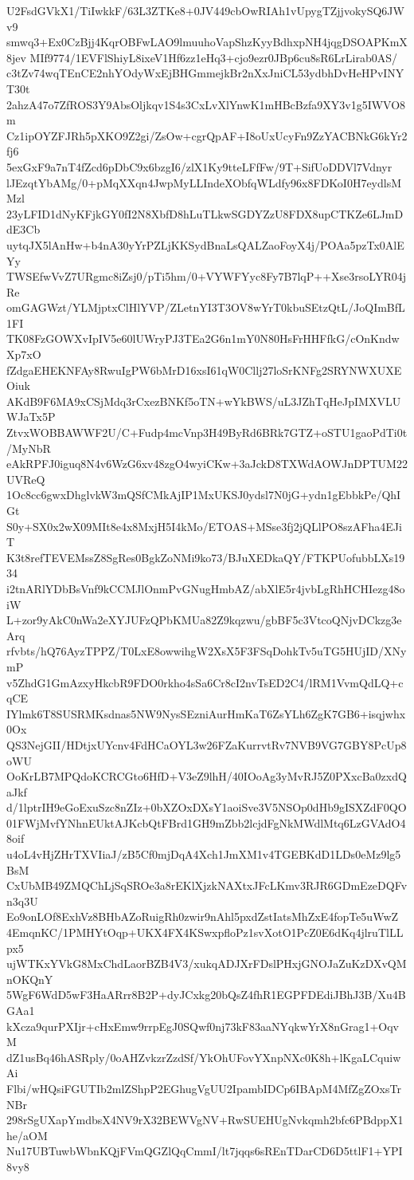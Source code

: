 U2FsdGVkX1/TiIwkkF/63L3ZTKe8+0JV449cbOwRIAh1vUpygTZjjvokySQ6JWv9
smwq3+Ex0CzBjj4KqrOBFwLAO9lmuuhoVapShzKyyBdhxpNH4jqgDSOAPKmX8jev
MIf9774/1EVFlShiyL8ixeV1Hf6zz1eHq3+cjo9ezr0JBp6cu8sR6LrLirab0AS/
c3tZv74wqTEnCE2nhYOdyWxEjBHGmmejkBr2nXxJniCL53ydbhDvHeHPvINYT30t
2ahzA47o7ZfROS3Y9AbsOljkqv1S4s3CxLvXlYnwK1mHBcBzfa9XY3v1g5IWVO8m
Cz1ipOYZFJRh5pXKO9Z2gi/ZsOw+cgrQpAF+I8oUxUcyFn9ZzYACBNkG6kYr2fj6
5exGxF9a7nT4fZcd6pDbC9x6bzgI6/zlX1Ky9tteLFfFw/9T+SifUoDDVl7Vdnyr
lJEzqtYbAMg/0+pMqXXqn4JwpMyLLIndeXObfqWLdfy96x8FDKoI0H7eydlsMMzl
23yLFID1dNyKFjkGY0fI2N8XbfD8hLuTLkwSGDYZzU8FDX8upCTKZe6LJmDdE3Cb
uytqJX5lAnHw+b4nA30yYrPZLjKKSydBnaLsQALZaoFoyX4j/POAa5pzTx0AlEYy
TWSEfwVvZ7URgmc8iZsj0/pTi5hm/0+VYWFYyc8Fy7B7lqP++Xse3rsoLYR04jRe
omGAGWzt/YLMjptxClHlYVP/ZLetnYI3T3OV8wYrT0kbuSEtzQtL/JoQImBfL1FI
TK08FzGOWXvIpIV5e60lUWryPJ3TEa2G6n1mY0N80HsFrHHFfkG/cOnKndwXp7xO
fZdgaEHEKNFAy8RwuIgPW6bMrD16xsI61qW0Cllj27loSrKNFg2SRYNWXUXEOiuk
AKdB9F6MA9xCSjMdq3rCxezBNKf5oTN+wYkBWS/uL3JZhTqHeJpIMXVLUWJaTx5P
ZtvxWOBBAWWF2U/C+Fudp4mcVnp3H49ByRd6BRk7GTZ+oSTU1gaoPdTi0t/MyNbR
eAkRPFJ0iguq8N4v6WzG6xv48zgO4wyiCKw+3aJckD8TXWdAOWJnDPTUM22UVReQ
1Oc8cc6gwxDhglvkW3mQSfCMkAjIP1MxUKSJ0ydsl7N0jG+ydn1gEbbkPe/QhIGt
S0y+SX0x2wX09MIt8e4x8MxjH5I4kMo/ETOAS+MSse3fj2jQLlPO8szAFha4EJiT
K3t8refTEVEMssZ8SgRes0BgkZoNMi9ko73/BJuXEDkaQY/FTKPUofubbLXs1934
i2tnARlYDbBsVnf9kCCMJlOnmPvGNugHmbAZ/abXlE5r4jvbLgRhHCHIezg48oiW
L+zor9yAkC0nWa2eXYJUFzQPbKMUa82Z9kqzwu/gbBF5c3VtcoQNjvDCkzg3eArq
rfvbts/hQ76AyzTPPZ/T0LxE8owwihgW2XsX5F3FSqDohkTv5uTG5HUjID/XNymP
v5ZhdG1GmAzxyHkcbR9FDO0rkho4sSa6Cr8cI2nvTsED2C4/lRM1VvmQdLQ+cqCE
IYlmk6T8SUSRMKsdnas5NW9NysSEzniAurHmKaT6ZsYLh6ZgK7GB6+isqjwhx0Ox
QS3NejGII/HDtjxUYcnv4FdHCaOYL3w26FZaKurrvtRv7NVB9VG7GBY8PcUp8oWU
OoKrLB7MPQdoKCRCGto6HfD+V3eZ9lhH/40IOoAg3yMvRJ5Z0PXxcBa0zxdQaJkf
d/1lptrIH9eGoExuSzc8nZIz+0bXZOxDXsY1aoiSve3V5NSOp0dHb9gISXZdF0QO
01FWjMvfYNhnEUktAJKcbQtFBrd1GH9mZbb2lcjdFgNkMWdlMtq6LzGVAdO48oif
u4oL4vHjZHrTXVIiaJ/zB5Cf0mjDqA4Xch1JmXM1v4TGEBKdD1LDs0eMz9lg5BsM
CxUbMB49ZMQChLjSqSROe3a8rEKlXjzkNAXtxJFcLKmv3RJR6GDmEzeDQFvn3q3U
Eo9onLOf8ExhVz8BHbAZoRuigRh0zwir9nAhl5pxdZstIatsMhZxE4fopTe5uWwZ
4EmqnKC/1PMHYtOqp+UKX4FX4KSwxpfloPz1svXotO1PcZ0E6dKq4jlruTlLLpx5
ujWTKxYVkG8MxChdLaorBZB4V3/xukqADJXrFDslPHxjGNOJaZuKzDXvQMnOKQnY
5WgF6WdD5wF3HaARrr8B2P+dyJCxkg20bQsZ4fhR1EGPFDEdiJBhJ3B/Xu4BGAa1
kXcza9qurPXIjr+cHxEmw9rrpEgJ0SQwf0nj73kF83aaNYqkwYrX8nGrag1+OqvM
dZ1usBq46hASRply/0oAHZvkzrZzdSf/YkOhUFovYXnpNXc0K8h+lKgaLCquiwAi
Flbi/wHQsiFGUTIb2mlZShpP2EGhugVgUU2IpambIDCp6IBApM4MfZgZOxsTrNBr
298rSgUXapYmdbsX4NV9rX32BEWVgNV+RwSUEHUgNvkqmh2bfc6PBdppX1he/aOM
Nu17UBTuwbWbnKQjFVmQGZlQqCmmI/lt7jqqs6sREnTDarCD6D5ttlF1+YPI8vy8
